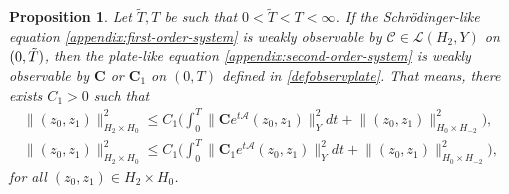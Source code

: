 \documentclass[JEP,XML,SOM,Unicode,published]{cedram}
\newtheorem{proposition}[theorem]{Proposition}
\theoremstyle{definition}
\let\mc\mathcal
\newcommand{\A}{\mc{A}}
\newcommand{\bC}{\boldsymbol{C}}
\providecommand{\norm}[1]{\lVert#1\rVert}
\begin{document}
\begin{proposition}\label{prop:w-plates-schr}
Let $\widetilde{T},T$ be such that $0 < \widetilde{T} < T < \infty$. If the Schrödinger-like equation
\eqref{appendix:first-order-system} is weakly observable by $\mc{C}\in \mc{L}(H_2, Y)$ on $(0, \Tilde{T})$, then the plate-like equation \eqref{appendix:second-order-system} is weakly observable by $\bC$ or $\bC_1$ on $(0, T)$ defined in \eqref{defobservplate}. That means, there exists $C_1>0$ such that
\begin{align}\label{ineq:wobs-plates}
\norm{(z_0, z_1)}_{H_2\times H_0}^2\leq C_1\biggl(\int_0^T \norm{\bC e^{t\A}(z_0, z_1)}_{Y}^2dt+\norm{(z_0, z_1)}_{H_{0}\times H_{-2}}^2\biggr),\\
\norm{(z_0, z_1)}_{H_2\times H_0}^2\leq C_1\biggl(\int_0^T \norm{\bC_1 e^{t\A}(z_0, z_1)}_{Y}^2dt+\norm{(z_0, z_1)}_{H_{0}\times H_{-2}}^2\biggr),
\end{align}
for all $(z_0, z_1)\in H_2\times H_0$.
\end{proposition}
\end{document}
